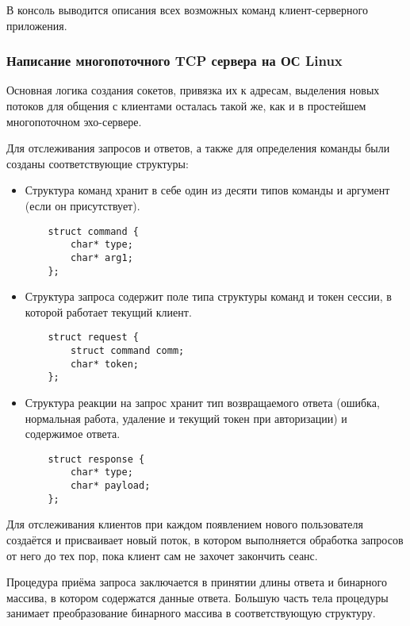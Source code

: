 В консоль выводится описания всех возможных команд клиент-серверного приложения.

\subsubsection{Написание многопоточного TCP сервера на ОС Linux}
Основная логика создания сокетов, привязка их к адресам, выделения новых потоков для общения с клиентами осталась такой же, как и в простейшем многопоточном эхо-сервере.

Для отслеживания запросов и ответов, а также для определения команды были созданы соответствующие структуры: 

\begin{itemize}
	\item Структура команд хранит в себе один из десяти типов команды и аргумент (если он присутствует).
	
	\begin{lstlisting}
	struct command {
		char* type;
		char* arg1;
	};
	\end{lstlisting}
	
	\item Структура запроса содержит поле типа структуры команд и токен сессии, в которой работает текущий клиент.
	
	\begin{lstlisting}
	struct request {
		struct command comm;
		char* token;
	};
	\end{lstlisting}
	
	\item Структура реакции на запрос хранит тип возвращаемого ответа (ошибка, нормальная работа, удаление и текущий токен при авторизации) и содержимое ответа.
	
	\begin{lstlisting}
	struct response {
		char* type;
		char* payload;
	};
	\end{lstlisting}
\end{itemize}

Для отслеживания клиентов при каждом появлением нового пользователя создаётся и присваивает новый поток, в котором выполняется обработка запросов от него до тех пор, пока клиент сам не захочет закончить сеанс.

Процедура приёма запроса заключается в принятии длины ответа и бинарного массива, в котором содержатся данные ответа. Большую часть тела процедуры занимает преобразование бинарного массива в соответствующую структуру.

